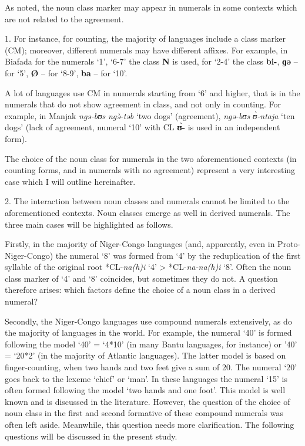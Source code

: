As noted, the noun class marker may appear in numerals in some contexts which are not related to the agreement. 

1. For instance, for counting, the majority of languages include a class marker (CM); moreover, different numerals may have different affixes. For example, in Biafada for the numerals ‘1’, ‘6-7’ the class \textbf{N} is used, for ‘2-4’ the class \textbf{bi-}, \textbf{ɡə} – for ‘5’, \textbf{Ø} – for ‘8-9’, \textbf{ba} – for ‘10’. 

A lot of languages use CM in numerals starting from ‘6’ and higher, that is in the numerals that do not show agreement in class, and not only in counting. For example, in Manjak \textit{ngə-bʊs} \textit{ng{\`{ə}}-təb} ‘two dogs’ (agreement), \textit{ngə-bʊs} \textit{{\`{ʊ}}-ntaja} ‘ten dogs’ (lack of agreement, numeral ‘10’ with CL \textbf{{\`{ʊ}}-} is used in an independent form). 

The choice of the noun class for numerals in the two aforementioned contexts (in counting forms, and in numerals with no agreement) represent a very interesting case which I will outline hereinafter. 

2. The interaction between noun classes and numerals cannot be limited to the aforementioned contexts. Noun classes emerge as well in derived numerals. The three main cases will be highlighted as follows. 

Firstly, in the majority of Niger-Congo languages (and, apparently, even in Proto-Niger-Congo) the numeral `8' was formed from `4' by the reduplication of the first syllable of the original root *CL-\textit{na(h)i} ‘4’ > *CL-\textit{na-na(h)i} ‘8’. Often the noun class marker of `4' and `8' coincides, but sometimes they do not. A question therefore arises: which factors define the choice of a noun class in a derived numeral? 

Secondly, the Niger-Congo languages use compound numerals extensively, as do the majority of languages in the world. For example, the numeral ‘40’ is formed following the model ‘40’ = ‘4*10’ (in many Bantu languages, for instance) or ’40’ = ‘20*2’ (in the majority of Atlantic languages). The latter model is based on finger-counting, when two hands and two feet give a sum of 20. The numeral ‘20’ goes back to the lexeme ‘chief’ or ‘man’. In these languages the numeral ‘15’ is often formed following the model ‘two hands and one foot’. This model is well known and is discussed in the literature. However, the question of the choice of noun class in the first and second formative of these compound numerals was often left aside. Meanwhile, this question needs more clarification. The following questions will be discussed in the present study. 

